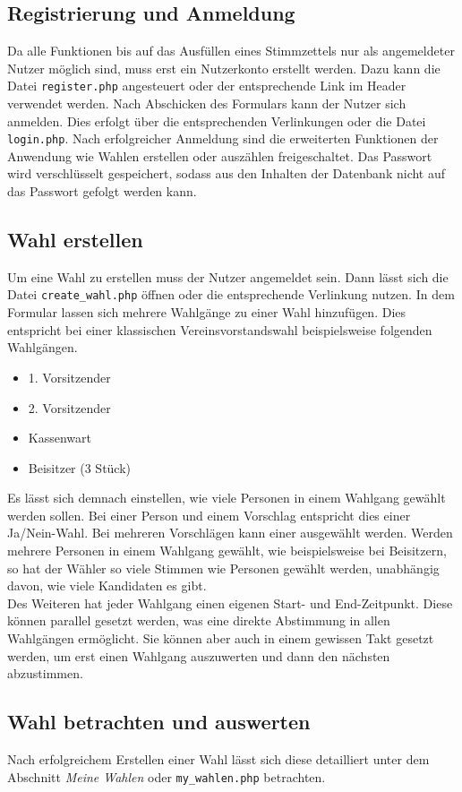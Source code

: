 \documentclass[a4paper]{scrartcl}
\newcommand{\file}[1]{\texttt{#1}}
\begin{document}
	\subsection{Registrierung und Anmeldung}
	Da alle Funktionen bis auf das Ausfüllen eines Stimmzettels nur als angemeldeter Nutzer möglich sind, muss erst ein Nutzerkonto erstellt werden. Dazu kann die Datei \file{register.php} angesteuert oder der entsprechende Link im Header verwendet werden. Nach Abschicken des Formulars kann der Nutzer sich anmelden. Dies erfolgt über die entsprechenden Verlinkungen oder die Datei \file{login.php}. Nach erfolgreicher Anmeldung sind die erweiterten Funktionen der Anwendung wie Wahlen erstellen oder auszählen freigeschaltet. Das Passwort wird verschlüsselt gespeichert, sodass aus den Inhalten der Datenbank nicht auf das Passwort gefolgt werden kann.
	
	\subsection{Wahl erstellen}
	Um eine Wahl zu erstellen muss der Nutzer angemeldet sein. Dann lässt sich die Datei \file{create\_wahl.php} öffnen oder die entsprechende Verlinkung nutzen. In dem Formular lassen sich mehrere Wahlgänge zu einer Wahl hinzufügen. Dies entspricht bei einer klassischen Vereinsvorstandswahl beispielsweise folgenden Wahlgängen.
	\begin{itemize}
		\item 1. Vorsitzender
		\item 2. Vorsitzender
		\item Kassenwart
		\item Beisitzer (3 Stück)
	\end{itemize}
	Es lässt sich demnach einstellen, wie viele Personen in einem Wahlgang gewählt werden sollen. Bei einer Person und einem Vorschlag entspricht dies einer Ja/Nein-Wahl. Bei mehreren Vorschlägen kann einer ausgewählt werden. Werden mehrere Personen in einem Wahlgang gewählt, wie beispielsweise bei Beisitzern, so hat der Wähler so viele Stimmen wie Personen gewählt werden, unabhängig davon, wie viele Kandidaten es gibt.\\
	
	\noindent Des Weiteren hat jeder Wahlgang einen eigenen Start- und End-Zeitpunkt. Diese können parallel gesetzt werden, was eine direkte Abstimmung in allen Wahlgängen ermöglicht. Sie können aber auch in einem gewissen Takt gesetzt werden, um erst einen Wahlgang auszuwerten und dann den nächsten abzustimmen.
	
	\subsection{Wahl betrachten und auswerten}
	Nach erfolgreichem Erstellen einer Wahl lässt sich diese detailliert unter dem Abschnitt \textit{Meine Wahlen} oder \file{my\_wahlen.php} betrachten.
	
\end{document}
